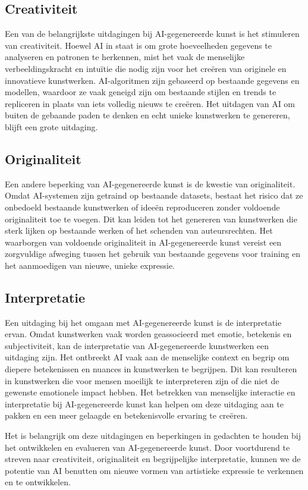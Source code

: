 \subsection{Creativiteit}
Een van de belangrijkste uitdagingen bij AI-gegenereerde kunst is het stimuleren van creativiteit. Hoewel AI in staat is om grote hoeveelheden gegevens te analyseren en patronen te herkennen, mist het vaak de menselijke verbeeldingskracht en intuïtie die nodig zijn voor het creëren van originele en innovatieve kunstwerken. AI-algoritmen zijn gebaseerd op bestaande gegevens en modellen, waardoor ze vaak geneigd zijn om bestaande stijlen en trends te repliceren in plaats van iets volledig nieuws te creëren. Het uitdagen van AI om buiten de gebaande paden te denken en echt unieke kunstwerken te genereren, blijft een grote uitdaging.

\subsection{Originaliteit}
Een andere beperking van AI-gegenereerde kunst is de kwestie van originaliteit. Omdat AI-systemen zijn getraind op bestaande datasets, bestaat het risico dat ze onbedoeld bestaande kunstwerken of ideeën reproduceren zonder voldoende originaliteit toe te voegen. Dit kan leiden tot het genereren van kunstwerken die sterk lijken op bestaande werken of het schenden van auteursrechten. Het waarborgen van voldoende originaliteit in AI-gegenereerde kunst vereist een zorgvuldige afweging tussen het gebruik van bestaande gegevens voor training en het aanmoedigen van nieuwe, unieke expressie.

\subsection{Interpretatie}
Een uitdaging bij het omgaan met AI-gegenereerde kunst is de interpretatie ervan. Omdat kunstwerken vaak worden geassocieerd met emotie, betekenis en subjectiviteit, kan de interpretatie van AI-gegenereerde kunstwerken een uitdaging zijn. Het ontbreekt AI vaak aan de menselijke context en begrip om diepere betekenissen en nuances in kunstwerken te begrijpen. Dit kan resulteren in kunstwerken die voor mensen moeilijk te interpreteren zijn of die niet de gewenste emotionele impact hebben. Het betrekken van menselijke interactie en interpretatie bij AI-gegenereerde kunst kan helpen om deze uitdaging aan te pakken en een meer gelaagde en betekenisvolle ervaring te creëren.

Het is belangrijk om deze uitdagingen en beperkingen in gedachten te houden bij het ontwikkelen en evalueren van AI-gegenereerde kunst. Door voortdurend te streven naar creativiteit, originaliteit en begrijpelijke interpretatie, kunnen we de potentie van AI benutten om nieuwe vormen van artistieke expressie te verkennen en te ontwikkelen.
